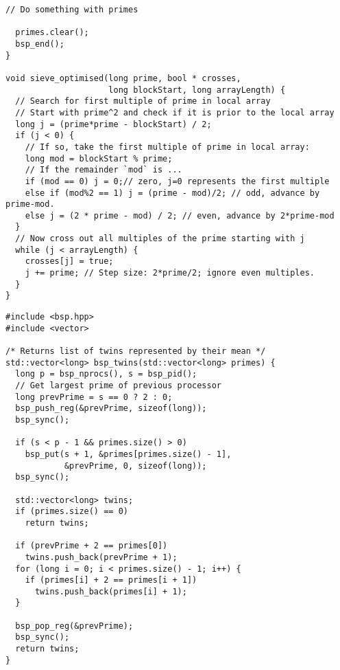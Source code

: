 \documentclass[a4paper,12pt]{article}
\begin{document}
\begin{lstlisting}[caption={Optimised parallel program for the Sieve of Eratosthenes}, label={prg:par_opt_sieve}, frame={single}]
  // Do something with primes

  primes.clear();
  bsp_end();
}

void sieve_optimised(long prime, bool * crosses,
                     long blockStart, long arrayLength) {
  // Search for first multiple of prime in local array
  // Start with prime^2 and check if it is prior to the local array
  long j = (prime*prime - blockStart) / 2;
  if (j < 0) {
    // If so, take the first multiple of prime in local array:
    long mod = blockStart % prime;
    // If the remainder `mod` is ...
    if (mod == 0) j = 0;// zero, j=0 represents the first multiple
    else if (mod%2 == 1) j = (prime - mod)/2; // odd, advance by prime-mod.
    else j = (2 * prime - mod) / 2; // even, advance by 2*prime-mod
  }
  // Now cross out all multiples of the prime starting with j
  while (j < arrayLength) {
    crosses[j] = true;
    j += prime; // Step size: 2*prime/2; ignore even multiples.
  }
}
	\end{lstlisting}

	\begin{lstlisting}[caption={Extension function for finding prime twins}, label={prg:par_opt_sieve}, frame={single}]
#include <bsp.hpp>
#include <vector>

/* Returns list of twins represented by their mean */
std::vector<long> bsp_twins(std::vector<long> primes) {
  long p = bsp_nprocs(), s = bsp_pid();
  // Get largest prime of previous processor
  long prevPrime = s == 0 ? 2 : 0;
  bsp_push_reg(&prevPrime, sizeof(long));
  bsp_sync();

  if (s < p - 1 && primes.size() > 0)
    bsp_put(s + 1, &primes[primes.size() - 1],
            &prevPrime, 0, sizeof(long));
  bsp_sync();

  std::vector<long> twins;
  if (primes.size() == 0)
    return twins;

  if (prevPrime + 2 == primes[0])
    twins.push_back(prevPrime + 1);
  for (long i = 0; i < primes.size() - 1; i++) {
    if (primes[i] + 2 == primes[i + 1])
      twins.push_back(primes[i] + 1);
  }

  bsp_pop_reg(&prevPrime);
  bsp_sync();
  return twins;
}
	\end{lstlisting}
	
\end{document}
